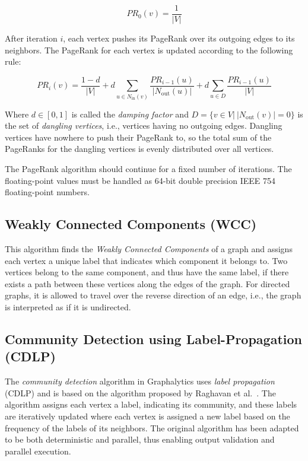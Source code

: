 \begin{equation}
PR_0(v) = \frac{1}{|V|}
\end{equation}

After iteration $i$, each vertex pushes its PageRank over its outgoing edges to its neighbors. The PageRank for each vertex is updated according to the following rule:

\begin{equation}
PR_i(v) = \frac{1-d}{|V|} + d \sum_{u \in N_\mathrm{in}(v)} \frac{PR_{i - 1}(u)}{|N_\mathrm{out}(u)|} + d \sum_{u \in D} \frac{PR_{i - 1}(u)}{|V|}
\end{equation}

Where $d \in [0,1]$ is called the \emph{damping factor} and $D=\{v \in V |~|N_\mathrm{out}(v)| = 0\}$ is the set of \emph{dangling vertices}, i.e., vertices having no outgoing edges. Dangling vertices have nowhere to push their PageRank to, so the total sum of the PageRanks for the dangling vertices is evenly distributed over all vertices. 

The PageRank algorithm should continue for a fixed number of iterations. The floating-point values must be handled as 64-bit double precision IEEE 754 floating-point numbers. 


\subsection{Weakly Connected Components (WCC)}
This algorithm finds the \emph{Weakly Connected Components} of a graph and assigns each vertex a unique label that indicates which component it belongs to. Two vertices belong to the same component, and thus have the same label, if there exists a path between these vertices along the edges of the graph. For directed graphs, it is allowed to travel over the reverse direction of an edge, i.e., the graph is interpreted as if it is undirected.


\subsection{Community Detection using Label-Propagation (CDLP)}
The \emph{community detection} algorithm in Graphalytics uses \emph{label propagation} (CDLP) and is based on the algorithm proposed by Raghavan et al.~\cite{raghavan2007near}. The algorithm assigns each vertex a label, indicating its community, and these labels are iteratively updated where each vertex is assigned a new label based on the frequency of the labels of its neighbors. The original algorithm has been adapted to be both deterministic and parallel, thus enabling output validation and parallel execution.


